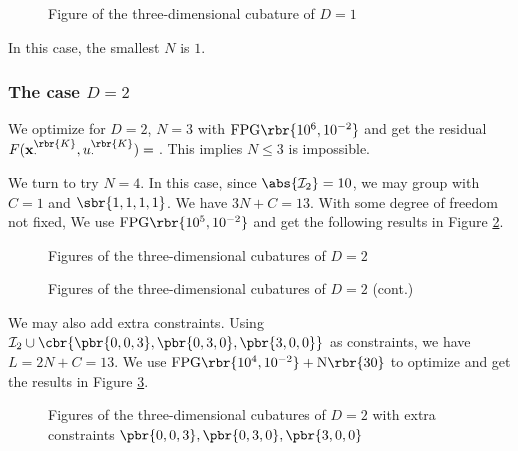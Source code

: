 \documentclass[english, nochinese]{pnote}
\begin{document}
\begin{figure}[htbp]
\centering
\scalebox{0.75}{}
\caption{Figure of the three-dimensional cubature of $ D = 1 $}
\label{Fig:M3D1}
\end{figure}

In this case, the smallest $N$ is $1$.

\subsubsection{The case $ D = 2 $}

We optimize for $ D = 2 $, $ N = 3 $ with $ \text{FPG} \rbr{ 10^6, 10^{-2} } $ and get the residual $ F ( \mathbf{x}_{\cdot}^{\rbr{K}}, u_{\cdot}^{\rbr{K}} ) = \text{} $. This implies $ N \le 3 $ is impossible.

We turn to try $ N = 4 $. In this case, since $ \abs{\mathcal{I}_2} = 10 $, we may group with $ C = 1 $ and $ \sbr{ 1, 1, 1, 1 } $. We have $ 3 N + C = 13 $. With some degree of freedom not fixed, We use $ \text{FPG} \rbr{ 10^5, 10^{-2} } $ and get the following results in Figure \ref{Fig:M3D2Ran}.

\begin{figure}[htbp]
\centering
\scalebox{0.75}{}
\scalebox{0.75}{}
\scalebox{0.75}{}
\caption{Figures of the three-dimensional cubatures of $ D = 2 $}
\label{Fig:M3D2Ran}
\end{figure}

\begin{figure}[htbp]
\ContinuedFloat
\centering
\scalebox{0.75}{}
\scalebox{0.75}{}
\scalebox{0.75}{}
\caption{Figures of the three-dimensional cubatures of $ D = 2 $ (cont.)}
\end{figure}

We may also add extra constraints. Using $ \mathcal{I}_2 \cup \cbr{ \pbr{ 0, 0, 3 }, \pbr{ 0, 3, 0 }, \pbr{ 3, 0, 0 } } $ as constraints, we have $ L = 2 N + C = 13 $. We use $ \text{FPG} \rbr{ 10^4, 10^{-2} } + \text{N} \rbr{30} $ to optimize and get the results in Figure \ref{Fig:M3D2333}.

\begin{figure}[htbp]
\centering
\scalebox{0.75}{}
\scalebox{0.75}{}
\caption{Figures of the three-dimensional cubatures of $ D = 2 $ with extra constraints $ \pbr{ 0, 0, 3 }, \pbr{ 0, 3, 0 }, \pbr{ 3, 0, 0 } $}
\label{Fig:M3D2333}
\end{figure}
\end{document}

